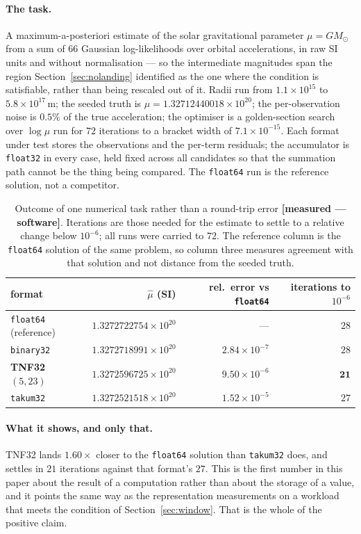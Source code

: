 \documentclass[11pt]{article}
\theoremstyle{definition}
\begin{document}
\paragraph{The task.} A maximum-a-posteriori estimate of the solar gravitational
parameter $\mu = GM_{\odot}$ from a sum of $66$ Gaussian log-likelihoods over
orbital accelerations, in raw SI units and without normalisation --- so the
intermediate magnitudes span the region Section~\ref{sec:nolanding} identified as
the one where the condition is satisfiable, rather than being rescaled out of it.
Radii run from $1.1\times 10^{15}$ to $5.8\times 10^{17}$\,m; the seeded truth is
$\mu = 1.32712440018\times 10^{20}$; the per-observation noise is $0.5\%$ of the
true acceleration; the optimiser is a golden-section search over $\log\mu$ run for
$72$ iterations to a bracket width of $7.1\times 10^{-15}$. Each format under test
stores the observations and the per-term residuals; the accumulator is
\texttt{float32} in every case, held fixed across all candidates so that the
summation path cannot be the thing being compared. The
\texttt{float64} run is the reference solution, not a competitor.

\begin{table}[t]\centering
\caption{Outcome of one numerical task rather than a round-trip error
\textbf{[measured --- software]}. Iterations are those needed for the estimate to
settle to a relative change below $10^{-6}$; all runs were carried to $72$.
The reference column is the \texttt{float64} solution of the same problem, so
column three measures agreement with that solution and not distance from the
seeded truth.}
\label{tab:downstream}
\begin{tabular}{lrrr}
\toprule
format & $\hat\mu$ (SI) & rel.\ error vs \texttt{float64} & iterations to $10^{-6}$ \\
\midrule
\texttt{float64} (reference) & $1.3272722754\times 10^{20}$ & --- & $28$ \\
\texttt{binary32}            & $1.3272718991\times 10^{20}$ & $2.84\times 10^{-7}$ & $28$ \\
\textbf{TNF32 $(5,23)$}      & $1.3272596725\times 10^{20}$ & $9.50\times 10^{-6}$ & $\mathbf{21}$ \\
\texttt{takum32}             & $1.3272521518\times 10^{20}$ & $1.52\times 10^{-5}$ & $27$ \\
\bottomrule
\end{tabular}
\end{table}

\paragraph{What it shows, and only that.} TNF32 lands $1.60\times$ closer to the
\texttt{float64} solution than \texttt{takum32} does, and settles in $21$
iterations against that format's $27$. This is the first number in this paper
about the result of a computation rather than about the storage of a value, and it
points the same way as the representation measurements on a workload that meets
the condition of Section~\ref{sec:window}. That is the whole of the positive
claim.
\end{document}
